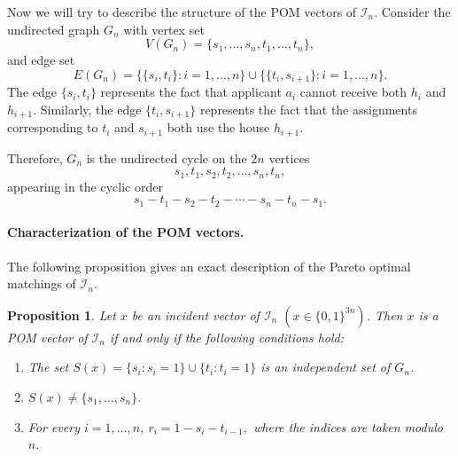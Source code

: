 \documentclass[12pt]{report}
\newtheorem{pprop}[base]{Proposition}
\numberwithin{algorithm}{chapter}
\begin{document}
	Now we will try to describe the structure of the POM vectors of $\mathcal{I}_n$. Consider the undirected graph $G_{n}$ with vertex set
	\[
	V(G_{n})=\{s_1,\ldots,s_n,t_1,\ldots,t_n\},
	\]
	and edge set
	\[
	E(G_{n})
	=
	\bigl\{\{s_i,t_i\}:i=1,\ldots,n\bigr\}
	\cup
	\bigl\{\{t_i,s_{i+1}\}:i=1,\ldots,n\bigr\}.
	\]
	The edge $\{s_i,t_i\}$ represents the fact that applicant $a_i$ cannot receive both $h_i$ and $h_{i+1}$. Similarly, the edge $\{t_i,s_{i+1}\}$ represents the fact that the assignments corresponding to $t_i$ and $s_{i+1}$ both use the house $h_{i+1}$.
	
	Therefore, $G_{n}$ is the undirected cycle on the $2n$ vertices
	\[
	s_1,t_1,s_2,t_2,\ldots,s_n,t_n,
	\]
	appearing in the cyclic order
	\[
	s_1-t_1-s_2-t_2-\cdots-s_n-t_n-s_1.
	\]
	
	\paragraph{Characterization of the POM vectors.}
	The following proposition gives an exact description of the Pareto optimal matchings of $\mathcal{I}_n$.

	\begin{pprop}
		Let $x$ be an incident vector of $\mathcal{I}_n$ $\left( x\in\{0,1\}^{3n} \right)$. Then $x$ is a POM vector of
		$\mathcal{I}_n$ if and only if the following conditions hold:
		\begin{enumerate}
			\item The set
			$S(x) = \{s_i:s_i=1\} \cup \{t_i:t_i=1\}$
			is an independent set of $G_n$.
			
			\item
			$S(x)\ne\{s_1,\ldots,s_n\}.	$
			
			\item For every $i=1,\ldots,n$,
			$r_i=1-s_i-t_{i-1},$
			where the indices are taken modulo $n$.
		\end{enumerate}
	\end{pprop}
	
\end{document}
